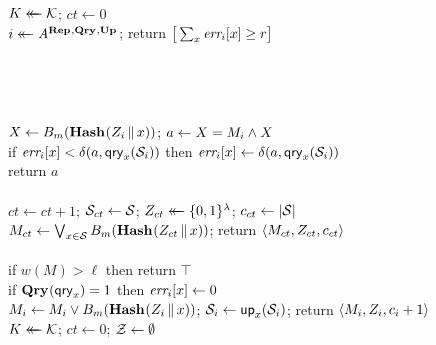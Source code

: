 \begin{figure*}
{
  \vspace{-7pt}
  \\[2pt]
    $K \mathrel{\leftarrow\mkern-14mu\leftarrow} \mathcal{K}$;
    $ct \gets 0$\\
    $i \mathrel{\leftarrow\mkern-14mu\leftarrow} \mathit{A}^{\textup{\textbf{Rep}}\hspace{0.5pt},\textup{\textbf{Qry}}\hspace{0.5pt},\textup{\textbf{Up}}\hspace{0.5pt}}$;
    return $\big[\sum_x \textit{err}_i[x] \geq r\big]$
  \\[6pt]
  \hfill{}\\[2pt]
    \\
  \\[6pt]
  \\[2pt]
    $X \gets {B}_m(\textup{\textbf{Hash}}\hspace{0.5pt}(Z_i \, \| \, x))$;
    $a \gets X = M_i \wedge X$\\
    if $\textit{err}_i[x] < \delta(a,\mathsf{qry}_x(\mathcal{S}_i))$ then
          $\textit{err}_i[x] \gets \delta(a,\mathsf{qry}_x(\mathcal{S}_i))$\\
    return $a$
  \\[6pt]
  \oraclev{$\REPO(\col)$}\\[2pt]
    $ct \gets ct+1$;
    $\mathcal{S}_{ct} \gets \mathcal{S}$;
    $Z_{ct} \mathrel{\leftarrow\mkern-14mu\leftarrow} \{0,1\}^\lambda$;
    $c_{ct} \gets |\mathcal{S}|$\\
    $M_{ct} \gets \bigvee_{x \in \mathcal{S}} {B}_m(\textup{\textbf{Hash}}\hspace{0.5pt}(Z_{ct} \, \| \, x))$;
    return $\langle M_{ct}, Z_{ct}, c_{ct} \rangle$
  \\[6pt]
  \\[2pt]
    if $w(M) > \ell$ then return $\top$\\
    if $\textup{\textbf{Qry}}\hspace{0.5pt}(\mathsf{qry}_x) = 1$ then $\textit{err}_i[x] \gets 0$\\
    $M_i \gets M_i \vee {B}_m(\textup{\textbf{Hash}}\hspace{0.5pt}(Z_i \, \| \, x))$;
    $\mathcal{S}_i \gets \mathsf{up}_x(\mathcal{S}_i)$;
    return $\langle M_i, Z_i, c_i+1\rangle$
}
{
  \vspace{-7pt}
  \hfill{}\\[2pt]
    $K \mathrel{\leftarrow\mkern-14mu\leftarrow} \mathcal{K}$;
    $ct \gets 0$;
    $\mathcal{Z} \gets \emptyset$\\
}
\end{figure*}
